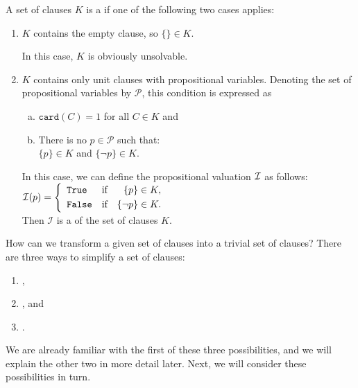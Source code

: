 \begin{Definition}
  A set of clauses $K$ is a  if one of the following two cases applies:
  \begin{enumerate}
  \item $K$ contains the empty clause, so $\{\} \in K$.

        In this case, $K$ is obviously unsolvable.
  \item $K$ contains only unit clauses with \underline{} propositional variables.
        Denoting the set of propositional variables by $\mathcal{P}$,
        this condition is expressed as 
        \begin{enumerate}[(a)]
        \item $\texttt{card}(C) = 1$ \quad for all $C \in K$ \quad and
        \item There is no $p \in \mathcal{P}$ such that: 
              \\[0.2cm]
              \hspace*{1.3cm}
              $\{p\} \in K$ \quad and \quad $\{\neg p\} \in K$.
        \end{enumerate}
        In this case, we can define the propositional valuation $\mathcal{I}$ as follows:
        \\[0.2cm]
        \hspace*{1.3cm}
        $\mathcal{I}(p) = \left\{
                   \begin{array}{lcr}
                     \texttt{True}  & \mbox{if} & \{p\}      \in K, \\[0.1cm]
                     \texttt{False} & \mbox{if} & \{\neg p\} \in K.
                   \end{array}
                 \right.
        $
        \\[0.2cm]
        Then $\mathcal{I}$ is a  of the set of clauses $K$. \eox
  \end{enumerate}
\end{Definition}

How can we transform a given set of clauses into a trivial set of clauses?
There are three ways to simplify a set of clauses:
\begin{enumerate}
\item {},
\item {}, and
\item {}.
\end{enumerate}
We are already familiar with the first of these three
possibilities, and we will explain the other two in more detail later.
Next, we will consider these possibilities in turn.

